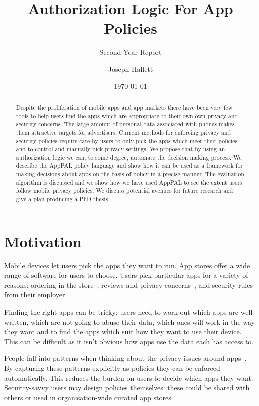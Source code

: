 \documentclass{scrartcl}
\title{Authorization Logic For App Policies}
\subtitle{Second Year Report}
\author{Joseph Hallett}
\date{\today{}}
\begin{document}
\maketitle{}

\begin{abstract}
  Despite the proliferation of mobile apps and app markets there have been very few tools to help users find the apps which are appropriate to their own own privacy and security concerns.
  The large amount of personal data associated with phones makes them attractive targets for advertisers.
  Current methods for enforcing privacy and security policies require care by users to only pick the apps which meet their policies and to control and manually pick privacy settings.
  We propose that by using an authorization logic we can, to some degree, automate the decision making process.
  We describe the AppPAL policy language and show how it can be used as a framework for making decisions about apps on the basis of policy in a precise manner.
  The evaluation algorithm is discussed and we show how we have used AppPAL to see the extent users follow mobile privacy policies.
  We discuss potential avenues for future research and give a plan producing a PhD thesis.
\end{abstract}

\section{Motivation}

Mobile devices let users pick the apps they want to run.
App stores offer a wide range of software for users to choose.
Users pick particular apps for a variety of reasons:
  ordering in the store~\citep{Prata:2012in},
  reviews and privacy concerns~\citep{Kelley:2013kc},
  and security rules from their employer.

Finding the right apps can be tricky:
  users need to work out which apps are well written, which are not going to abuse their data, which ones will work in the way they want
  and to find the apps which suit how they want to use their device.
This can be difficult as it isn't obvious how apps use the data each has access to.

People fall into patterns when thinking about the privacy issues around apps~\citep{Sadeh:2014vq}.
By capturing these patterns explicitly as policies they can be enforced automatically.
This reduces the burden on users to decide which apps they want.
Security-savvy users may design policies themselves: these could be shared with others or used in organisation-wide curated app stores.
\end{document}

